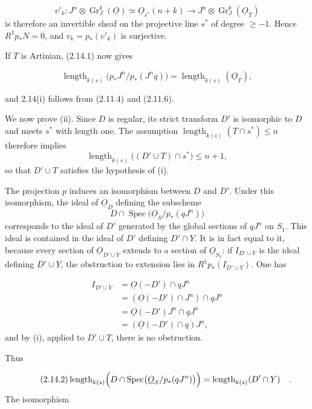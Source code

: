 \begin{equation*}
v'_k:J^n\otimes\operatorname{Gr}_J^k(\underline{O})
\simeq\underline{O}_{s^*}(n+k)
\longrightarrow
J^n\otimes\operatorname{Gr}_J^k(\underline{O}_T)
\end{equation*}
is therefore an invertible sheaf on the projective line $s^*$ of degree
$\geq-1$.  Hence $R^1p_*N=0$, and $v_k=p_*(v'_k)$ is surjective.

If $T$ is Artinian, (2.14.1) now gives

\begin{equation*}
\operatorname{length}_{k(s)}
\bigl(p_*J^n/p_*(J^nq)\bigr)
=\operatorname{length}_{k(s)}(\underline{O}_T),
\end{equation*}


and 2.14(i) follows from (2.11.4) and (2.11.6).

We now prove (ii).  Since $D$ is regular, its strict transform $D'$ is
isomorphic to $D$ and meets $s^*$ with length one.  The assumption
$\operatorname{length}_{k(s)}(T\cap s^*)\leq n$ therefore implies
\[
\operatorname{length}_{k(s)}\bigl((D'\cup T)\cap s^*\bigr)\leq n+1,
\]
so that $D'\cup T$ satisfies the hypothesis of (i).

The projection $p$ induces an isomorphism between $D$ and $D'$.  Under this
isomorphism, the ideal of $\underline{O}_D$ defining the subscheme
\[
D\cap\operatorname{Spec}\bigl(\underline{O}_S/p_*(qJ^n)\bigr)
\]
corresponds to the ideal of $D'$ generated by the global sections of $qJ^n$ on
$S_1$.  This ideal is contained in the ideal of $D'$ defining $D'\cap Y$.
It is in fact equal to it, because every section of
$\underline{O}_{D'\cup Y}$ extends to a section of $\underline{O}_{S_1}$:
if $I_{D'\cup Y}$ is the ideal defining $D'\cup Y$, the obstruction to
extension lies in $R^1p_*(I_{D'\cup Y})$.  One has

\begin{equation*}
\begin{aligned}
I_{D'\cup Y}
&=\underline{O}(-D')\cap qJ^n\\
&=(\underline{O}(-D')\cap J^n)\cap qJ^n\\
&=\underline{O}(-D')J^n\cap qJ^n\\
&=(\underline{O}(-D')\cap q)J^n,
\end{aligned}
\end{equation*}
and by (i), applied to $D'\cup T$, there is no obstruction.

Thus

\begin{equation}\tag{2.14.2}
\operatorname{length}_{k(s)}
\Bigl(D\cap
\operatorname{Spec}\bigl(\underline{O}_S/p_*(qJ^n)\bigr)\Bigr)
=\operatorname{length}_{k(s)}(D'\cap Y) \quad .
\end{equation}
The isomorphism

